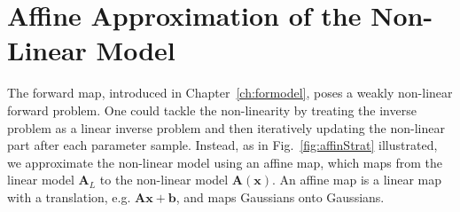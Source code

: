 \chapter{Affine Approximation of the Non-Linear Model}
\label{ch:affine}
\newcommand*{\vertbar}{\rule[-1ex]{0.5pt}{2.5ex}}
\newcommand*{\horzbar}{\rule[.5ex]{2.5ex}{0.5pt}}

The forward map, introduced in Chapter~\ref{ch:formodel}, poses a weakly non-linear forward problem.
One could tackle the non-linearity by treating the inverse problem as a linear inverse problem and then iteratively updating the non-linear part after each parameter sample.
Instead, as in Fig.~\ref{fig:affinStrat} illustrated, we approximate the non-linear model using an affine map, which maps from the linear model $\bm{A}_L$ to the non-linear model $\bm{A}(\bm{x})$.
An affine map is a linear map with a translation, e.g. $\bm{A}\bm{x} + \bm{b}$, and maps Gaussians onto Gaussians.


